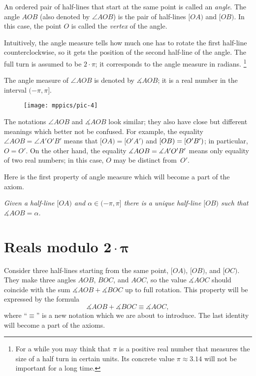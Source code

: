 An ordered pair of half-lines that start at the same point is called an \emph{angle}.
The angle $AOB$ (also denoted by $\angle AOB$) is the pair of half-lines $[OA)$ and $[OB)$.
In this case, the point $O$ is called the \emph{vertex} of the angle.

Intuitively, the angle measure tells how much one has to rotate the first half-line counterclockwise, so it gets the position of the second half-line of the angle. 
The full turn is assumed to be $2\cdot\pi$;
it corresponds to the angle measure in radians.%
\footnote{For a while you may think that $\pi$ is a positive real number that measures the size of a half turn in certain units. Its concrete value $\pi\approx 3.14$ will not be important for a long time.}

The angle measure of $\angle AOB$ is denoted by $\measuredangle AOB$;
it is a real number in the interval $(-\pi,\pi]$. 

\begin{wrapfigure}{o}{25mm}
\vskip-0mm
\centering
\texttt{[image: mppics/pic-4]}
\end{wrapfigure}

The notations $\angle AOB$ and $\measuredangle AOB$ look similar;
they also have close but different meanings which better not be confused.
For example, the equality 
$\angle AOB=\angle A'O'B'$
means that
$[OA)=[O'A')$ and $[OB)\z=[O'B')$;
in particular, $O=O'$.
On the other hand, the equality 
$\measuredangle AOB\z=\measuredangle A'O'B'$ 
means only equality of two real numbers;
in this case, $O$ may be distinct from~$O'$.

Here is the first property of angle measure which will become a part of the axiom.

\textit{Given a half-line $[O A)$ and $\alpha\in(-\pi,\pi]$ there is a unique half-line $[O B)$ such that $\measuredangle A O B= \alpha$.}



\section[\texorpdfstring{Reals modulo $2\cdot\pi$}{Reals modulo 2·π}]{Reals modulo $\bm{2\cdot\pi}$}



Consider three half-lines starting from the same point, $[O A)$, $[O B)$, and $[O C)$.
They make three angles $A O B$, $B O C$, and $A O C$,
so the value $\measuredangle A O C$ should coincide with
the sum $\measuredangle A O B+\measuredangle B O C$ up to full rotation.
This property will be expressed by the formula 
$$\measuredangle A O B+\measuredangle B O C\equiv \measuredangle A O C,$$
where ``$\equiv$'' is a new notation which we are about to introduce.
The last identity will become a part of the axioms.


